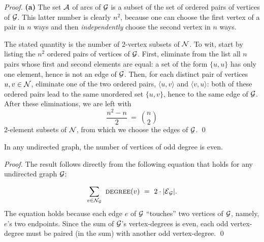 \begin{proof}
{\bf (a)}
The set $\mbox{$\cal A$}$ of arcs of $\mbox{$\cal G$}$ is a subset of the set of ordered
pairs of vertices of $\mbox{$\cal G$}$.  This latter number is clearly $n^2$, because
one can choose the first vertex of a pair in $n$ ways and then
{\em independently} choose the second vertex in $n$ ways.

\medskip

The stated quantity is the number of $2$-vertex subsets of $\mbox{$\cal N$}$.  To
wit, start by listing the $n^2$ ordered pairs of vertices of $\mbox{$\cal G$}$.
First, eliminate from the list all $n$ pairs whose first and second
elements are equal: a set of the form $\{ u,u\}$ has only one element,
hence is not an edge of $\mbox{$\cal G$}$.  Then, for each distinct pair of vertices
$u, v \in \mbox{$\cal N$}$, eliminate one of the two ordered pairs, $\langle
u,v \rangle$ and $\langle v,u \rangle$: both of these ordered pairs
lead to the same unordered set $\{ u,v\}$, hence to the same edge of
$\mbox{$\cal G$}$.  After these eliminations, we are left with
\[ \frac{n^2 - n}{2} \ = \ {n \choose 2} \]
$2$-element subsets of $\mbox{$\cal N$}$, from which we choose the edges of $\mbox{$\cal G$}$. \qed
\end{proof}


\begin{prop}
\label{thm:even-num-odd-degrees}
In any undirected graph, the number of vertices of odd degree is even.
\end{prop}

\begin{proof}
The result follows directly from the following equation that holds for
any undirected graph $\mbox{$\cal G$}$:

\[ \sum_{v \in {\cal N}_{\cal G}} \ \mbox{\sc degree}(v) \ = \ 2 \cdot |\e_{\cal G}|.
\]
The equation holds because each edge $e$ of $\mbox{$\cal G$}$ ``touches'' two vertices
of $\mbox{$\cal G$}$, namely, $e$'s two endpoints.  Since the sum of $\mbox{$\cal G$}$'s
vertex-degrees is even, each odd vertex-degree must be paired (in the sum)
with another odd vertex-degree.  \qed
\end{proof}


\medskip


